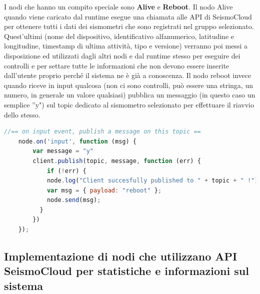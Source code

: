 \documentclass[a4paper,10pt]{memoir}
\begin{document}
I nodi che hanno un compito speciale sono \textbf{Alive} e \textbf{Reboot}.
Il nodo Alive quando viene caricato dal runtime esegue una chiamata alle API di SeismoCloud per ottenere tutti i dati dei sismometri che sono registrati nel gruppo selezionato. Quest'ultimi (nome del dispositivo, identificativo alfanumerico, latitudine e longitudine, timestamp di ultima attività, tipo e versione) verranno poi messi a disposizione ed utilizzati dagli altri nodi e dal runtime stesso per eseguire dei controlli e per settare tutte le informazioni che non devono essere inserite dall'utente proprio perché il sistema ne è già a conoscenza.
Il nodo reboot invece quando riceve in input qualcosa (non ci sono controlli, può essere una stringa, un numero, in generale un valore qualsiasi) pubblica un messaggio (in questo caso un semplice ''y") sul topic dedicato al sismometro selezionato per effettuare il riavvio dello stesso.
\begin{lstlisting}[language=Javascript, firstnumber=80]
    //== on input event, publish a message on this topic ==
    node.on('input', function (msg) {
        var message = "y"
        client.publish(topic, message, function (err) {
            if (!err) {
            node.log("Client succesfully published to " + topic + " !");
            var msg = { payload: "reboot" };
            node.send(msg);
          }
        })
    });
\end{lstlisting}

\subsection{Implementazione di nodi che utilizzano API SeismoCloud per statistiche e informazioni sul sistema}
\end{document}
